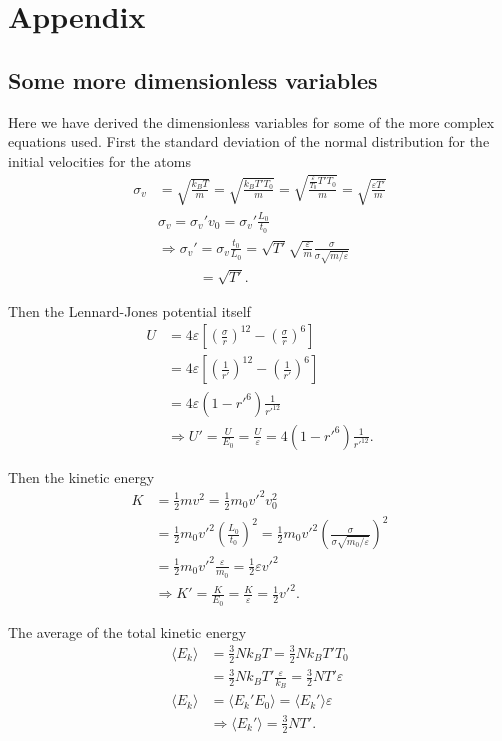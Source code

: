 \FloatBarrier
\section*{Appendix}
\subsection*{Some more dimensionless variables}
Here we have derived the dimensionless variables for some of the more complex equations used. First the standard deviation of the normal distribution for the initial velocities for the atoms
\begin{align*}
    \sigma_v &= \sqrt{\frac{k_BT}{m}} = \sqrt{\frac{k_BT'T_0}{m}} = \sqrt{\frac{\frac{\varepsilon}{T_0}T'T_0}{m}} = \sqrt{\frac{\varepsilon T'}{m}} \\
    &\sigma_v = \sigma_v'v_0 = \sigma_v' \frac{L_0}{t_0} \\
    &\Rightarrow \sigma_v' = \sigma_v \frac{t_0}{L_0} = \sqrt{T'} \sqrt{\frac{\varepsilon}{m}} \frac{\sigma}{\sigma \sqrt{m/\varepsilon}} \\
    &\phantom{\Rightarrow \sigma v'}= \sqrt{T'}.
\end{align*}

Then the Lennard-Jones potential itself
\begin{align*}
    U &= 4\varepsilon \left[\left(\frac{\sigma}{r}\right)^{12} - \left(\frac{\sigma}{r}\right)^6 \right] \\
    &= 4\varepsilon \left[\left(\frac{1}{r'}\right)^{12} - \left(\frac{1}{r'}\right)^6 \right] \\
    &= 4\varepsilon \left(1 - r'^6 \right)\frac{1}{r'^{12}} \\
    &\Rightarrow U' = \frac{U}{E_0} = \frac{U}{\varepsilon} = 4 \left(1 - r'^6 \right)\frac{1}{r'^{12}}.
\end{align*}

Then the kinetic energy
\begin{align*}
    K &= \frac{1}{2}mv^2 = \frac{1}{2}m_0v'^2v_0^2 \\
    &= \frac{1}{2}m_0v'^2 \left(\frac{L_0}{t_0}\right)^2 = \frac{1}{2}m_0v'^2 \left(\frac{\sigma}{\sigma\sqrt{m_0/\varepsilon}}\right)^2 \\
    &= \frac{1}{2}m_0v'^2 \frac{\varepsilon}{m_0} = \frac{1}{2}\varepsilon v'^2 \\
    &\Rightarrow K' = \frac{K}{E_0} = \frac{K}{\varepsilon} = \frac{1}{2} v'^2.
\end{align*}

The average of the total kinetic energy
\begin{align*}
    \langle E_k \rangle &= \frac{3}{2}Nk_B T = \frac{3}{2} Nk_B T'T_0 \\
    &= \frac{3}{2} Nk_B T'\frac{\varepsilon}{k_B} = \frac{3}{2} NT'\varepsilon \\
    \langle E_k \rangle &= \langle E_k'E_0 \rangle = \langle E_k' \rangle \varepsilon \\
    &\Rightarrow \langle E_k' \rangle = \frac{3}{2}NT'.
\end{align*}

